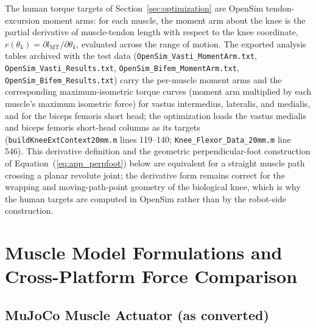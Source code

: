 The human torque targets of Section~\ref{sec:optimization} are OpenSim
tendon-excursion moment arms: for each muscle, the moment arm about the
knee is the partial derivative of muscle-tendon length with respect to
the knee coordinate, $r(\theta_{k}) = \partial l_{\mathrm{MT}} /
\partial\theta_{k}$, evaluated across the range of motion. The exported
analysis tables archived with the test data
(\texttt{OpenSim\_Vasti\_MomentArm.txt}, \texttt{OpenSim\_Vasti\_Results.txt},
\texttt{OpenSim\_Bifem\_MomentArm.txt}, \texttt{OpenSim\_Bifem\_Results.txt})
carry the per-muscle moment arms and the corresponding
maximum-isometric torque curves (moment arm multiplied by each
muscle's maximum isometric force) for vastus intermedius,
lateralis, and medialis, and for the biceps femoris short head; the
optimization loads the vastus medialis and biceps femoris short-head
columns as its targets (\texttt{buildKneeExtContext20mm.m} lines
119--140; \texttt{Knee\_Flexor\_Data\_20mm.m} line 546). This
derivative definition and the geometric perpendicular-foot construction
of Equation~(\ref{eq:app_perpfoot}) below are equivalent for a straight
muscle path crossing a planar revolute joint; the derivative form
remains correct for the wrapping and moving-path-point geometry of the
biological knee, which is why the human targets are computed in OpenSim
rather than by the robot-side construction.

\section{Muscle Model Formulations and Cross-Platform Force Comparison}
\label{sec:muscle-models}

\subsection{MuJoCo Muscle Actuator (as converted)}

